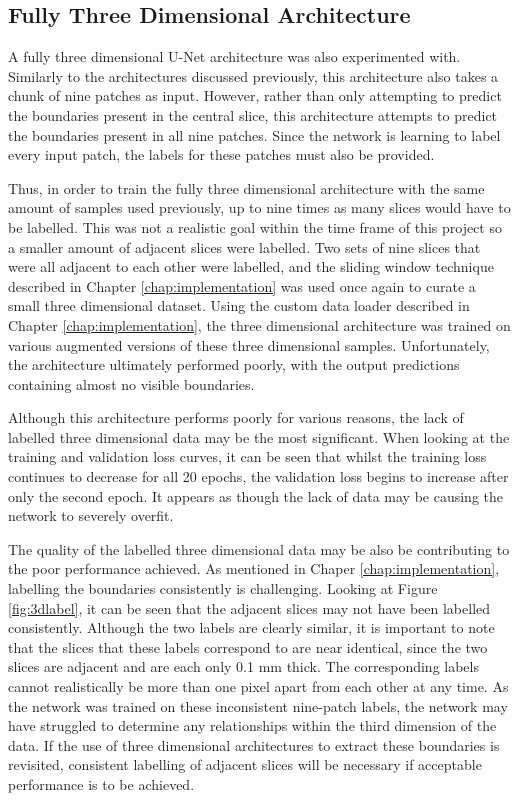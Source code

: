 \subsection{Fully Three Dimensional Architecture}
\label{sec:eval3darch}

A fully three dimensional U-Net architecture was also experimented with. Similarly to the architectures discussed previously, this architecture also takes a chunk of nine patches as input. However, rather than only attempting to predict the boundaries present in the central slice, this architecture attempts to predict the boundaries present in all nine patches. Since the network is learning to label every input patch, the labels for these patches must also be provided.

Thus, in order to train the fully three dimensional architecture with the same amount of samples used previously, up to nine times as many slices would have to be labelled. This was not a realistic goal within the time frame of this project so a smaller amount of adjacent slices were labelled. Two sets of nine slices that were all adjacent to each other were labelled, and the sliding window technique described in Chapter \ref{chap:implementation} was used once again to curate a small three dimensional dataset. Using the custom data loader described in Chapter \ref{chap:implementation}, the three dimensional architecture was trained on various augmented versions of these three dimensional samples. Unfortunately, the architecture ultimately performed poorly, with the output predictions containing almost no visible boundaries.

Although this architecture performs poorly for various reasons, the lack of labelled three dimensional data may be the most significant. When looking at the training and validation loss curves, it can be seen that whilst the training loss continues to decrease for all 20 epochs, the validation loss begins to increase after only the second epoch. It appears as though the lack of data may be causing the network to severely overfit.

The quality of the labelled three dimensional data may be also be contributing to the poor performance achieved. As mentioned in Chaper \ref{chap:implementation}, labelling the boundaries consistently is challenging. Looking at Figure \ref{fig:3dlabel}, it can be seen that the adjacent slices may not have been labelled consistently. Although the two labels are clearly similar, it is important to note that the slices that these labels correspond to are near identical, since the two slices are adjacent and are each only 0.1 mm thick. The corresponding labels cannot realistically be more than one pixel apart from each other at any time. As the network was trained on these inconsistent nine-patch labels, the network may have struggled to determine any relationships within the third dimension of the data. If the use of three dimensional architectures to extract these boundaries is revisited, consistent labelling of adjacent slices will be necessary if acceptable performance is to be achieved.

